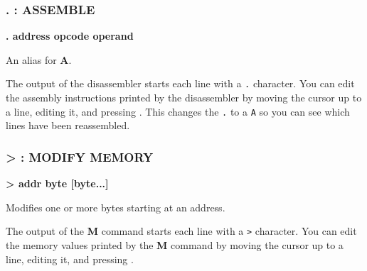 \subsubsection{. : ASSEMBLE}
\begin{description}[leftmargin=2cm,style=nextline]
\item [Format:] {\bf . address opcode operand}
\item [Usage:] An alias for {\bf A}.

\item [Remarks:] The output of the disassembler starts each line with a {\tt .} character. You can edit the assembly instructions printed by the disassembler by moving the cursor up to a line, editing it, and pressing . This changes the {\tt .} to a {\tt A} so you can see which lines have been reassembled.

\end{description}


\subsubsection{> : MODIFY MEMORY}
\begin{description}[leftmargin=2cm,style=nextline]
\item [Format:] {\bf > addr byte [byte...]}
\item [Usage:] Modifies one or more bytes starting at an address.

\item [Remarks:] The output of the {\bf M} command starts each line with a {\tt >} character. You can edit the memory values printed by the {\bf M} command by moving the cursor up to a line, editing it, and pressing .

\end{description}


